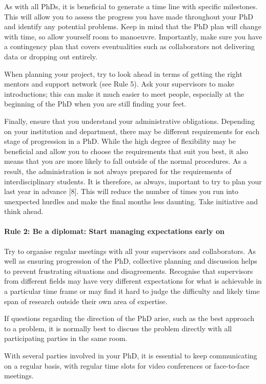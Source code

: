 \documentclass[12pt]{report}
\begin{document}
As with all PhDs, it is beneficial to generate a time line with specific milestones. This will allow you to assess the progress you have made throughout your PhD and identify any potential problems. Keep in mind that the PhD plan will change with time, so allow yourself room to manoeuvre. Importantly, make sure you have a contingency plan that covers eventualities such as collaborators not delivering data or dropping out entirely.

When planning your project, try to look ahead in terms of getting the right mentors and support network (see Rule 5). Ask your supervisors to make introductions; this can make it much easier to meet people, especially at the beginning of the PhD when you are still finding your feet.

Finally, ensure that you understand your administrative obligations. Depending on your institution and department, there may be different requirements for each stage of progression in a PhD. While the high degree of flexibility may be beneficial and allow you to choose the requirements that suit you best, it also means that you are more likely to fall outside of the normal procedures. As a result, the administration is not always prepared for the requirements of interdisciplinary students. It is therefore, as always, important to try to plan your last year in advance [8]. This will reduce the number of times you run into unexpected hurdles and make the final months less daunting. Take initiative and think ahead.

\paragraph{Rule 2: Be a diplomat: Start managing expectations early on}

Try to organise regular meetings with all your supervisors and collaborators. As well as ensuring progression of the PhD, collective planning and discussion helps to prevent frustrating situations and disagreements. Recognise that supervisors from different fields may have very different expectations for what is achievable in a particular time frame or may find it hard to judge the difficulty and likely time span of research outside their own area of expertise.

If questions regarding the direction of the PhD arise, such as the best approach to a problem, it is normally best to discuss the problem directly with all participating parties in the same room.

With several parties involved in your PhD, it is essential to keep communicating on a regular basis, with regular time slots for video conferences or face-to-face meetings.
\end{document}

